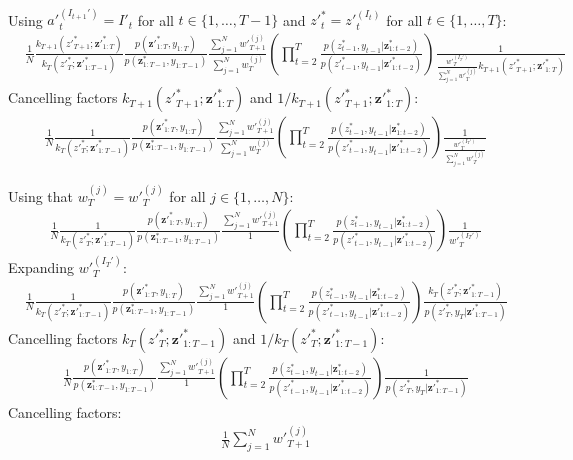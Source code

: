 \documentclass[11pt]{article}
\newcommand{\z}{\mathbf{z}}
\begin{document}
{\begin{minipage}{\linewidth}
\begin{align*}
\end{align*}
Using ${a'}_t^{(I_{t+1}')} = I'_t$ for all $t \in \{1, \ldots, T-1\}$ and ${z'}^*_t = {z'}_t^{(I_t)}$ for all $t \in \{1, \ldots, T\}$:
\begin{align*}
&
\frac{1}{N}
\frac{
k_{T+1}({z'}_{T+1}^*; {\z'}_{1:T}^*)
}{
k_T({z'}_T^*; {\z'}_{1:T-1}^*)
}
\frac{p({\z'}_{1:T}^*, y_{1:T})}{p({\z}_{1:T-1}^*, y_{1:T-1})}
\frac{
\sum_{j=1}^N {w'}_{T+1}^{(j)}
}{
\sum_{j=1}^N {w}_{T}^{(j)}
}
\left( \prod_{t=2}^T \frac{p(z_{t-1}^*, y_{t-1} | {\z}_{1:t-2}^{*})}{p({z'}_{t-1}^*, y_{t-1} | {\z'}_{1:t-2}^*)} \right)
\frac{1}{
\frac{{w'}_{T}^{(I_T')}}{\sum_{j=1}^N {w'}_{T}^{(j)}} k_{T+1}({z'}_{T+1}^{*}; {\z'}_{1:T}^{*} )
}
\end{align*}
Cancelling factors $k_{T+1}({z'}_{T+1}^*; {\z'}_{1:T}^*)$ and $1 / k_{T+1}({z'}_{T+1}^*; {\z'}_{1:T}^*)$:
\begin{align*}
&
\frac{1}{N}
\frac{
1
}{
k_T({z'}_T^*; {\z'}_{1:T-1}^*)
}
\frac{p({\z'}_{1:T}^*, y_{1:T})}{p({\z}_{1:T-1}^*, y_{1:T-1})}
\frac{
\sum_{j=1}^N {w'}_{T+1}^{(j)}
}{
\sum_{j=1}^N {w}_{T}^{(j)}
}
\left( \prod_{t=2}^T \frac{p(z_{t-1}^*, y_{t-1} | {\z}_{1:t-2}^{*})}{p({z'}_{t-1}^*, y_{t-1} | {\z'}_{1:t-2}^*)} \right)
\frac{1}{
\frac{{w'}_{T}^{(I_T')}}{\sum_{j=1}^N {w'}_{T}^{(j)}}
}
\end{align*}

Using that $w_T^{(j)} = {w'}_T^{(j)}$ for all $j \in \{1, \ldots, N\}$:
\begin{align*}
&
\frac{1}{N}
\frac{
1
}{
k_T({z'}_T^*; {\z'}_{1:T-1}^*)
}
\frac{p({\z'}_{1:T}^*, y_{1:T})}{p({\z}_{1:T-1}^*, y_{1:T-1})}
\frac{
\sum_{j=1}^N {w'}_{T+1}^{(j)}
}{
1
}
\left( \prod_{t=2}^T \frac{p(z_{t-1}^*, y_{t-1} | {\z}_{1:t-2}^{*})}{p({z'}_{t-1}^*, y_{t-1} | {\z'}_{1:t-2}^*)} \right)
\frac{1}{
{w'}_{T}^{(I_T')}
}
\end{align*}
Expanding ${w'}_T^{(I_T')}$:
\begin{align*}
&
\frac{1}{N}
\frac{
1
}{
k_T({z'}_T^*; {\z'}_{1:T-1}^*)
}
\frac{p({\z'}_{1:T}^*, y_{1:T})}{p({\z}_{1:T-1}^*, y_{1:T-1})}
\frac{
\sum_{j=1}^N {w'}_{T+1}^{(j)}
}{
1
}
\left( \prod_{t=2}^T \frac{p(z_{t-1}^*, y_{t-1} | {\z}_{1:t-2}^{*})}{p({z'}_{t-1}^*, y_{t-1} | {\z'}_{1:t-2}^*)} \right)
\frac{
k_T({z'}_{T}^*; {\z'}_{1:T-1}^*)
}{
p({z'}_{T}^*, y_T| {\z'}_{1:T-1}^*)
}
\end{align*}
Cancelling factors $k_T({z'}_T^*; {\z'}_{1:T-1}^*)$ and $1 / k_T({z'}_T^*; {\z'}_{1:T-1}^*)$:
\begin{align*}
&
\frac{1}{N}
\frac{p({\z'}_{1:T}^*, y_{1:T})}{p({\z}_{1:T-1}^*, y_{1:T-1})}
\frac{
\sum_{j=1}^N {w'}_{T+1}^{(j)}
}{
1
}
\left( \prod_{t=2}^T \frac{p(z_{t-1}^*, y_{t-1} | {\z}_{1:t-2}^{*})}{p({z'}_{t-1}^*, y_{t-1} | {\z'}_{1:t-2}^*)} \right)
\frac{
1
}{
p({z'}_{T}^*, y_T| {\z'}_{1:T-1}^*)
}
\end{align*}
Cancelling factors:
\begin{align*}
& \frac{1}{N} \sum_{j=1}^N {w'}_{T+1}^{(j)}
\end{align*}
\end{minipage}
} %

 
\end{document}
